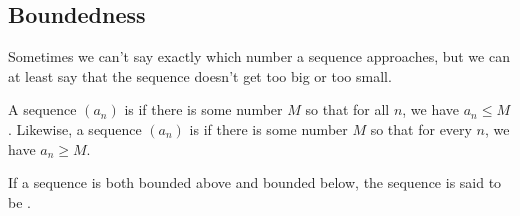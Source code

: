 \documentclass{ximera}
\begin{document}
\subsection{Boundedness}

Sometimes we can't say exactly which number a sequence approaches, but
we can at least say that the sequence doesn't get too big or too
small.

\begin{definition}
  \label{definition:sequence-bounded}
  A sequence $(a_n)$ is  if there is some number $M$ so that for all $n$, we have $
  a_n\le M$.  Likewise, a sequence $(a_n)$ is  if there is some number $M$
  so that for every $n$, we have $ a_n\ge M$.

If a sequence is both bounded above and bounded below, the sequence is said
to be .
\end{definition}

\end{document}
